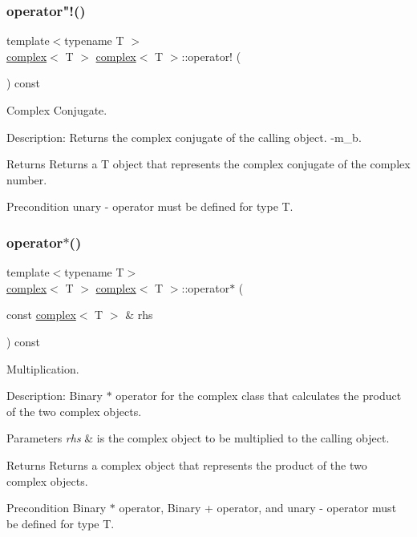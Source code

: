 \subsubsection{\texorpdfstring{operator"!()}{operator!()}}
{\footnotesize\ttfamily template$<$typename T $>$ \\
\hyperlink{classcomplex}{complex}$<$ T $>$ \hyperlink{classcomplex}{complex}$<$ T $>$\+::operator! (\begin{DoxyParamCaption}{ }\end{DoxyParamCaption}) const}



Complex Conjugate. 

Description\+: Returns the complex conjugate of the calling object. -\/m\+\_\+b. \begin{DoxyReturn}{Returns}
Returns a T object that represents the complex conjugate of the complex number. 
\end{DoxyReturn}
\begin{DoxyPrecond}{Precondition}
unary -\/ operator must be defined for type T. 
\end{DoxyPrecond}
\mbox{\label{classcomplex_ad2f08f4f8eea0ef2def536898addd7f3}} 
\subsubsection{\texorpdfstring{operator$\ast$()}{operator*()}}
{\footnotesize\ttfamily template$<$typename T$>$ \\
\hyperlink{classcomplex}{complex}$<$ T $>$ \hyperlink{classcomplex}{complex}$<$ T $>$\+::operator$\ast$ (\begin{DoxyParamCaption}\item[{const \hyperlink{classcomplex}{complex}$<$ T $>$ \&}]{rhs }\end{DoxyParamCaption}) const}



Multiplication. 

Description\+: Binary $\ast$ operator for the complex class that calculates the product of the two complex objects. 
\begin{DoxyParams}{Parameters}
{\em rhs} & is the complex object to be multiplied to the calling object. \\
\hline
\end{DoxyParams}
\begin{DoxyReturn}{Returns}
Returns a complex object that represents the product of the two complex objects. 
\end{DoxyReturn}
\begin{DoxyPrecond}{Precondition}
Binary $\ast$ operator, Binary + operator, and unary -\/ operator must be defined for type T. 
\end{DoxyPrecond}
\mbox{\label{classcomplex_a98240d564a6667f9acf5163821365cdc}} 
